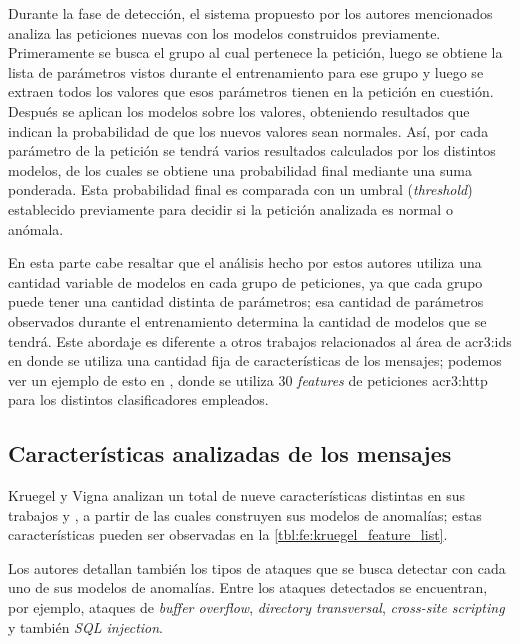 Durante la fase de detección, el sistema propuesto por los autores
mencionados analiza las peticiones nuevas con los modelos construidos
previamente. Primeramente se busca el grupo al cual pertenece la petición,
luego se obtiene la lista de parámetros vistos durante el entrenamiento
para ese grupo y luego se extraen todos los valores que esos parámetros
tienen en la petición en cuestión. Después se aplican los modelos sobre
los valores, obteniendo resultados que indican la probabilidad de que
los nuevos valores sean normales.
Así, por cada parámetro de la petición se tendrá varios resultados calculados
por los distintos modelos, de los cuales se obtiene una probabilidad final
mediante una suma ponderada. Esta probabilidad final es comparada con un
umbral (\textit{threshold}) establecido previamente para decidir si la
petición analizada es normal o anómala.

En esta parte cabe resaltar que el análisis hecho por estos autores utiliza
una cantidad variable de modelos en cada grupo de peticiones, ya que cada
grupo puede tener una cantidad distinta de parámetros; esa cantidad de
parámetros observados durante el entrenamiento determina la cantidad de
modelos que se tendrá.
Este abordaje es diferente a otros trabajos relacionados al área de
\gls{acr3:ids} en donde se utiliza una cantidad fija de características
de los mensajes; podemos ver un ejemplo de esto en
\citep{nguyen2011application}, %
donde se utiliza 30 \textit{features} de peticiones \gls{acr3:http}
para los distintos clasificadores empleados.


\subsection{Características analizadas de los mensajes}

Kruegel y Vigna analizan un total de nueve características distintas
en sus trabajos \citep{kruegel2003anomaly} y \citep{kruegel2005multi},
a partir de las cuales construyen sus modelos de anomalías; estas
características pueden ser observadas en la
\autoref{tbl:fe:kruegel_feature_list}.

Los autores detallan también los tipos de ataques que se busca detectar
con cada uno de sus modelos de anomalías. Entre los ataques detectados se
encuentran, por ejemplo, ataques de \textit{buffer overflow},
\textit{directory transversal}, \textit{cross-site scripting}
y también \textit{SQL injection}.

